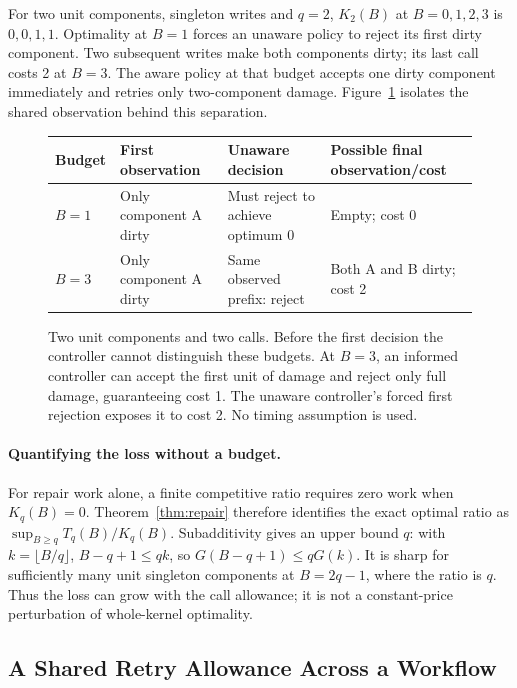 For two unit components, singleton writes and $q=2$, $K_2(B)$ at $B=0,1,2,3$ is $0,0,1,1$. Optimality at $B=1$ forces an unaware policy to reject its first dirty component. Two subsequent writes make both components dirty; its last call costs 2 at $B=3$. The aware policy at that budget accepts one dirty component immediately and retries only two-component damage. Figure~\ref{fig:information} isolates the shared observation behind this separation.

\begin{figure}[ht]
\centering\small
\begin{tabularx}{\linewidth}{lXXX}
\toprule
Budget & First observation & Unaware decision & Possible final observation/cost\\
\midrule
$B=1$ & Only component A dirty & Must reject to achieve optimum 0 & Empty; cost 0\\
$B=3$ & Only component A dirty & Same observed prefix: reject & Both A and B dirty; cost 2\\
\bottomrule
\end{tabularx}
\caption{Two unit components and two calls. Before the first decision the controller cannot distinguish these budgets. At $B=3$, an informed controller can accept the first unit of damage and reject only full damage, guaranteeing cost 1. The unaware controller's forced first rejection exposes it to cost 2. No timing assumption is used.}
\label{fig:information}
\end{figure}

\paragraph{Quantifying the loss without a budget.}
For repair work alone, a finite competitive ratio requires zero work when $K_q(B)=0$. Theorem~\ref{thm:repair} therefore identifies the exact optimal ratio as $\sup_{B\ge q}T_q(B)/K_q(B)$. Subadditivity gives an upper bound $q$: with $k=\lfloor B/q\rfloor$, $B-q+1\le qk$, so $G(B-q+1)\le qG(k)$. It is sharp for sufficiently many unit singleton components at $B=2q-1$, where the ratio is $q$. Thus the loss can grow with the call allowance; it is not a constant-price perturbation of whole-kernel optimality.

\subsection{A Shared Retry Allowance Across a Workflow}
\label{sec:partialdag}

